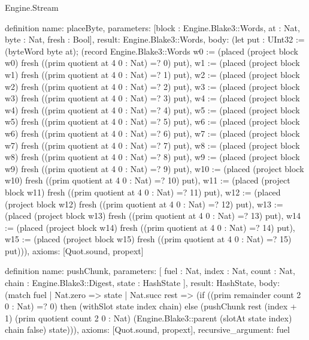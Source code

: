 \begin{lexlean}{Engine.Stream}
\begin{semanticmodule}
definition{
  name: placeByte,
  parameters: [block : Engine.Blake3::Words, at : Nat, byte : Nat, fresh : Bool],
  result: Engine.Blake3::Words,
  body: (let put : UInt32 := (byteWord byte at); (record Engine.Blake3::Words {w0 := (placed (project block w0) fresh ((prim quotient at 4 0 : Nat) =? 0) put), w1 := (placed (project block w1) fresh ((prim quotient at 4 0 : Nat) =? 1) put), w2 := (placed (project block w2) fresh ((prim quotient at 4 0 : Nat) =? 2) put), w3 := (placed (project block w3) fresh ((prim quotient at 4 0 : Nat) =? 3) put), w4 := (placed (project block w4) fresh ((prim quotient at 4 0 : Nat) =? 4) put), w5 := (placed (project block w5) fresh ((prim quotient at 4 0 : Nat) =? 5) put), w6 := (placed (project block w6) fresh ((prim quotient at 4 0 : Nat) =? 6) put), w7 := (placed (project block w7) fresh ((prim quotient at 4 0 : Nat) =? 7) put), w8 := (placed (project block w8) fresh ((prim quotient at 4 0 : Nat) =? 8) put), w9 := (placed (project block w9) fresh ((prim quotient at 4 0 : Nat) =? 9) put), w10 := (placed (project block w10) fresh ((prim quotient at 4 0 : Nat) =? 10) put), w11 := (placed (project block w11) fresh ((prim quotient at 4 0 : Nat) =? 11) put), w12 := (placed (project block w12) fresh ((prim quotient at 4 0 : Nat) =? 12) put), w13 := (placed (project block w13) fresh ((prim quotient at 4 0 : Nat) =? 13) put), w14 := (placed (project block w14) fresh ((prim quotient at 4 0 : Nat) =? 14) put), w15 := (placed (project block w15) fresh ((prim quotient at 4 0 : Nat) =? 15) put)})),
  axioms: [Quot.sound, propext]
}

definition{
  name: pushChunk,
  parameters: [
    fuel : Nat,
    index : Nat,
    count : Nat,
    chain : Engine.Blake3::Digest,
    state : HashState
  ],
  result: HashState,
  body: (match fuel
    | Nat.zero => state
    | Nat.succ rest => (if ((prim remainder count 2 0 : Nat) =? 0) then (withSlot state index chain) else (pushChunk rest (index + 1) (prim quotient count 2 0 : Nat) (Engine.Blake3::parent (slotAt state index) chain false) state))),
  axioms: [Quot.sound, propext],
  recursive_argument: fuel
}


\end{semanticmodule}
\end{lexlean}
